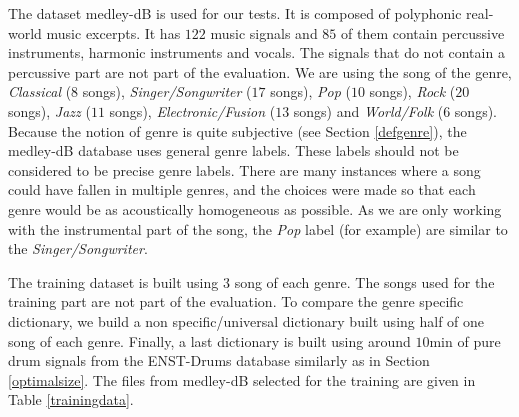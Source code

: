 \documentclass{article}
\begin{document}
The dataset medley-dB \cite{bittner2014medleydb} is used for our tests. It is composed of polyphonic real-world music excerpts. It has $122$ music signals and $85$ of them contain percussive instruments, harmonic instruments and vocals. The signals that do not contain a percussive part are not part of the evaluation. We are using the song of the genre, \emph{Classical} ($8$ songs), \emph{Singer/Songwriter} ($17$ songs), \emph{Pop} ($10$ songs), \emph{Rock} ($20$ songs), \emph{Jazz} ($11$ songs), \emph{Electronic/Fusion} ($13$ songs) and \emph{World/Folk} ($6$ songs). Because the notion of genre is quite subjective (see Section \ref{defgenre}), the medley-dB database uses general genre labels. These labels should not be considered to be precise genre labels. There are many instances where a song could have fallen in multiple genres, and the choices were made so that each genre would be as acoustically homogeneous as possible. As we are only working with the instrumental part of the song, the \emph{Pop} label (for example) are similar to the \emph{Singer/Songwriter}.

The training dataset is built using $3$ song of each genre. The songs used for the training part are not part of the evaluation. To compare the genre specific dictionary, we build a non specific/universal dictionary built using half of one song of each genre. Finally, a last dictionary is built using around $10$min of pure drum signals from the ENST-Drums database similarly as in Section \ref{optimalsize}. The files from medley-dB selected for the training are given in Table \ref{trainingdata}. 
\end{document}
